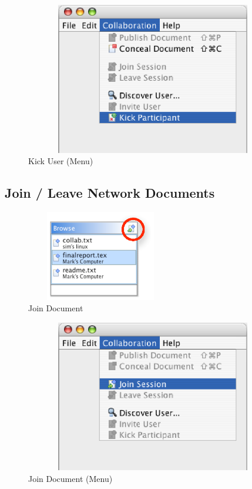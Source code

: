 \documentclass[11pt,a4paper]{article}
\begin{document}
\begin{figure}[H]
\begin{center}
  \includegraphics[height=2.62in, width=6.31in]{../images/usermanual/menu_collab_kick.eps}
\caption{Kick User (Menu)}
\label{default}
\end{center}
\end{figure}

\subsection{Join / Leave Network Documents}

\begin{figure}[H]
\begin{center}
  \includegraphics[height=1.56in, width=2.56in]{../images/usermanual/g_bview_join.eps}
\caption{Join Document}
\label{default}
\end{center}
\end{figure}

\begin{figure}[H]
\begin{center}
  \includegraphics[height=2.62in, width=6.31in]{../images/usermanual/menu_collab_join.eps}
\caption{Join Document (Menu)}
\label{default}
\end{center}
\end{figure}
\end{document}

